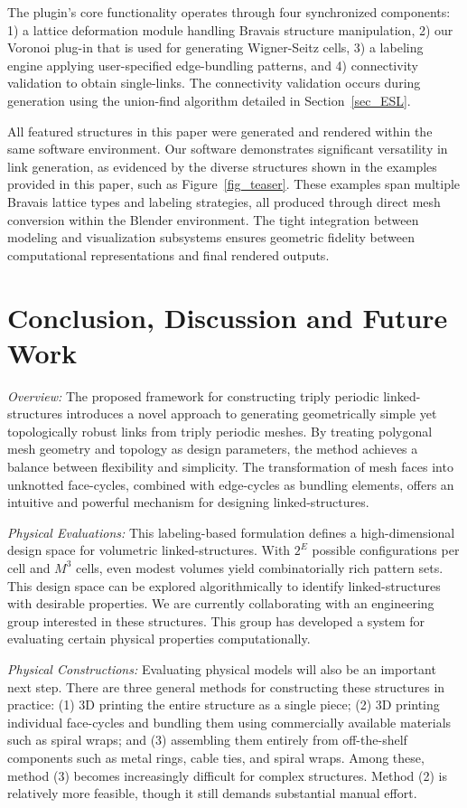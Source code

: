 \documentclass[times,twocolumn,final]{elsarticle}
\begin{document}
The plugin's core functionality operates through four synchronized components: 1) a lattice deformation module handling Bravais structure manipulation, 2) our Voronoi plug-in that is used for generating Wigner-Seitz cells, 3) a labeling engine applying user-specified edge-bundling patterns, and 4) connectivity validation to obtain single-links. The connectivity validation occurs during generation using the union-find algorithm detailed in Section~\ref{sec_ESL}.

All featured structures in this paper were generated and rendered within the same software environment.
Our software demonstrates significant versatility in link generation, as evidenced by the diverse structures shown in the examples provided in this paper, such as Figure~\ref{fig_teaser}. These examples span multiple Bravais lattice types and labeling strategies, all produced through direct mesh conversion within the Blender environment. The tight integration between modeling and visualization subsystems ensures geometric fidelity between computational representations and final rendered outputs.


\section{Conclusion, Discussion and Future Work}


\textit{Overview:} The proposed framework for constructing triply periodic linked-structures introduces a novel approach to generating geometrically simple yet topologically robust links from triply periodic meshes. By treating polygonal mesh geometry and topology as design parameters, the method achieves a balance between flexibility and simplicity. The transformation of mesh faces into unknotted face-cycles, combined with edge-cycles as bundling elements, offers an intuitive and powerful mechanism for designing linked-structures.

\textit{Physical Evaluations:} This labeling-based formulation defines a high-dimensional design space for volumetric linked-structures. With $2^E$ possible configurations per cell and $M^3$ cells, even modest volumes yield combinatorially rich pattern sets. This design space can be explored algorithmically to identify linked-structures with desirable properties. We are currently collaborating with an engineering group interested in these structures. This group has developed a system for evaluating certain physical properties computationally.

\textit{Physical Constructions:} Evaluating physical models will also be an important next step. There are three general methods for constructing these structures in practice: (1) 3D printing the entire structure as a single piece; (2) 3D printing individual face-cycles and bundling them using commercially available materials such as spiral wraps; and (3) assembling them entirely from off-the-shelf components such as metal rings, cable ties, and spiral wraps. Among these, method (3) becomes increasingly difficult for complex structures. Method (2) is relatively more feasible, though it still demands substantial manual effort.
\end{document}
